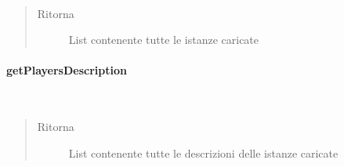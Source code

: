 \documentclass[letterpaper,10pt,italian,openany,oneside]{sphinxmanual}
\begin{document}
\begin{fulllineitems}
\label{\detokenize{test/it/unicam/cs/pa/mastermind/factories/PlayerFactoryRegistry:it.unicam.cs.pa.mastermind.factories.PlayerFactoryRegistry.getPlayerFactoriesInstances()}}~\begin{quote}\begin{description}
\item[{Ritorna}] \leavevmode
List contenente tutte le istanze  caricate

\end{description}\end{quote}

\end{fulllineitems}



\paragraph{getPlayersDescription}
\label{\detokenize{test/it/unicam/cs/pa/mastermind/factories/PlayerFactoryRegistry:getplayersdescription}}

\begin{fulllineitems}
\label{\detokenize{test/it/unicam/cs/pa/mastermind/factories/PlayerFactoryRegistry:it.unicam.cs.pa.mastermind.factories.PlayerFactoryRegistry.getPlayersDescription()}}~\begin{quote}\begin{description}
\item[{Ritorna}] \leavevmode
List contenente tutte le descrizioni delle istanze  caricate

\end{description}\end{quote}

\end{fulllineitems}
\end{document}
